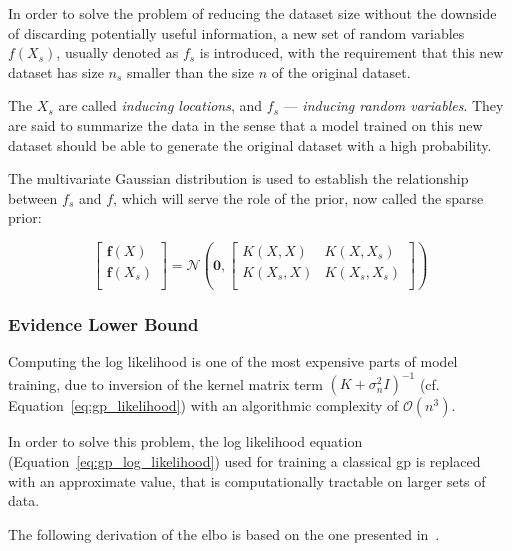 In order to solve the problem of reducing the dataset size without the downside
of discarding potentially useful information, a new set of random variables
$f(X_s)$, usually denoted as $f_s$ is introduced, with the requirement that this
new dataset has size $n_s$  smaller than the size $n$ of the original dataset. 

The $X_s$ are called \textit{inducing locations}, and $f_s$ --- \textit{inducing
random variables}. They are said to summarize the data in the sense that a model
trained on this new dataset should be able to generate the original dataset with
a high probability.

The multivariate Gaussian distribution is used to establish the relationship
between $f_s$ and $f$, which will serve the role of the prior, now called the
sparse prior:

\begin{equation}
    \begin{bmatrix}
        \mathbf{f}(X) \\
        \mathbf{f}(X_s) \\
    \end{bmatrix} = 
    \mathcal{N}\left(
        \mathbf{0}, 
        \begin{bmatrix}
            K(X, X) & K(X, X_s) \\
            K(X_s, X) & K(X_s, X_s) \\
        \end{bmatrix}
    \right)
\end{equation}

\subsubsection{Evidence Lower Bound}\label{sec:elbo}

Computing the log likelihood is one of the most expensive parts of model
training, due to inversion of the kernel matrix term ${\left(K +
\sigma_n^2I\right)}^{-1}$ (cf. Equation~\ref{eq:gp_likelihood}) with an
algorithmic complexity of $\mathcal{O}(n^3)$.

In order to solve this problem, the log likelihood equation
(Equation~\ref{eq:gp_log_likelihood}) used for training a
classical \acrshort{gp} is replaced with an approximate value, that is
computationally tractable on larger sets of data.

The following derivation of the \acrshort{elbo} is based on the one presented
in~\cite{yangUnderstandingVariationalLower}.

